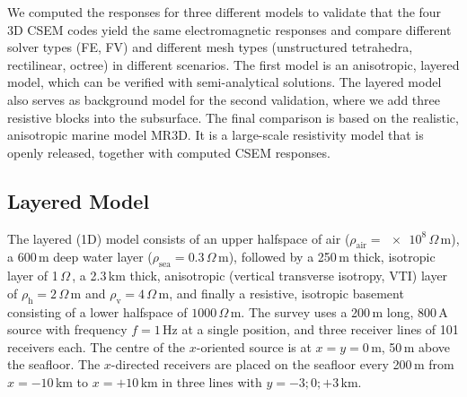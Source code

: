 \documentclass[extra, camera,%
]{gji}
\newcommand{\ohmm}{\ensuremath{\Omega\,}\text{m}\xspace}
\begin{document}
We computed the responses for three different models to validate that the four 3D CSEM codes yield the same electromagnetic responses and compare different solver types (FE, FV) and different mesh types (unstructured tetrahedra, rectilinear, octree) in different scenarios. The first model is an anisotropic, layered model, which can be verified with semi-analytical solutions. The layered model also serves as background model for the second validation, where we add three resistive blocks into the subsurface. The final comparison is based on the realistic, anisotropic marine model MR3D. It is a large-scale resistivity model that is openly released, together with computed CSEM responses.

\subsection{Layered Model}

The layered (1D) model consists of an upper halfspace of air ($\rho_\text{air}=\num{e8}\,\ohmm$), a 600\,m deep water layer ($\rho_\text{sea}=0.3\,\ohmm$), followed by a 250\,m thick, isotropic layer of 1\,\ohmm, a 2.3\,km thick, anisotropic (vertical transverse isotropy, VTI) layer of $\rho_\text{h}=2\,\ohmm$ and $\rho_\text{v}=4\,\ohmm$, and finally a resistive, isotropic basement consisting of a lower halfspace of $1000\,\ohmm$. The survey uses a 200\,m long, 800\,A source  with frequency $f=1\,$Hz at a single position, and three receiver lines of 101 receivers each. The centre of the $x$-oriented source is at $x=y=0\,$m, 50\,m above the seafloor. The $x$-directed receivers are placed on the seafloor every 200\,m from $x=-10\,$km to $x=+10\,$km in three lines with $y=-3; 0; +3\,$km.
\end{document}
